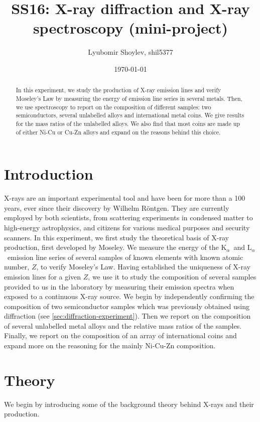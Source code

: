 \documentclass[11pt,a4paper,twoside,onecolumn]{article}
\title{\textbf{SS16: X-ray diffraction and X-ray spectroscopy (mini-project)}}
\author{Lyubomir Shoylev, shil5377}
\date{\today}
\newcommand{\Kalpha}{$\mathrm{K}_\alpha$~}
\newcommand{\Lalpha}{$\mathrm{L}_\alpha$~}
\begin{document}
\maketitle

\begin{abstract}
    In this experiment, we study the production of X-ray emission lines and verify Moseley's Law by measuring the energy of emission line series in several metals. Then, we use spectroscopy to report on the composition of different samples: two semiconductors, several unlabelled alloys and international metal coins. We give results for the mass ratios of the unlabelled alloys. We also find that most coins are made up of either Ni-Cu or Cu-Zn alloys and expand on the reasons behind this choice.
\end{abstract}

\section{Introduction}
X-rays are an important experimental tool and have been for more than a 100 years, ever since their discovery by Wilhelm R\"{o}ntgen. They are currently employed by both scientists, from scattering experiments in condensed matter to high-energy astrophysics, and citizens for various medical purposes and security scanners. In this experiment, we first study the theoretical basis of X-ray production, first developed by Moseley. We measure the energy of the \Kalpha and \Lalpha emission line series of several samples of known elements with known atomic number, $Z$, to verify Moseley's Law. Having established the uniqueness of X-ray emission lines for a given $Z$, we use it to study the composition of several samples provided to us in the laboratory by measuring their emission spectra when exposed to a continuous X-ray source. We begin by independently confirming the composition of two semiconductor samples which was previously obtained using diffraction (see \ref{sec:diffraction-experiment}). Then we report on the composition of several unlabelled metal alloys and the relative mass ratios of the samples. Finally, we report on the composition of an array of international coins and expand more on the reasoning for the mainly Ni-Cu-Zn composition.

\section{Theory}
We begin by introducing some of the background theory behind X-rays and their production.
\end{document}
